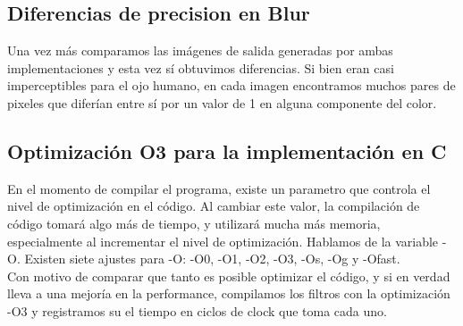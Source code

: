 \documentclass[10pt,a4paper,spanish]{article}
\begin{document}
\begin{center}
\end{center}

\subsection{Diferencias de precision en Blur}

Una vez más comparamos las imágenes de salida generadas por ambas implementaciones y esta vez sí obtuvimos diferencias. Si bien eran casi imperceptibles para el ojo humano, en cada imagen encontramos muchos pares de pixeles que diferían entre sí por un valor de 1 en alguna componente del color.




\subsection{Optimización O3 para la implementación en C}

En el momento de compilar el programa, existe un parametro que controla el nivel de optimización en el código. Al cambiar este valor, la compilación de código tomará algo más de tiempo, y utilizará mucha más memoria, especialmente al incrementar el nivel de optimización. Hablamos de la variable -O. Existen siete ajustes para -O: -O0, -O1, -O2, -O3, -Os, -Og y -Ofast. \\

Con motivo de comparar que tanto es posible optimizar el código, y si en verdad lleva a una mejoría en la performance, compilamos los filtros con la optimización -O3 y registramos su el tiempo en ciclos de clock que toma cada uno. \\
\end{document}
